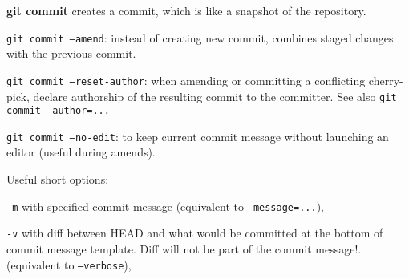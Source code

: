 %

\textbf{git commit} creates a commit, which is like a snapshot of the repository.

\texttt{git commit --amend}: instead of creating new commit, combines staged changes with the previous commit.

\texttt{git commit --reset-author}: when amending or committing a conflicting cherry-pick, declare authorship of the resulting commit to the committer.
See also \texttt{git commit --author=...}

\texttt{git commit --no-edit}: to keep current commit message without launching an editor (useful during amends).

Useful short options:
\begin{compactenum}
\item [\texttt{-m}] with specified commit message (equivalent to \texttt{--message=...}),
\item [\texttt{-v}] with diff between HEAD and what would be committed at the bottom of commit message template.
Diff will not be part of the commit message!.
(equivalent to \texttt{--verbose}),
\end{compactenum}

%